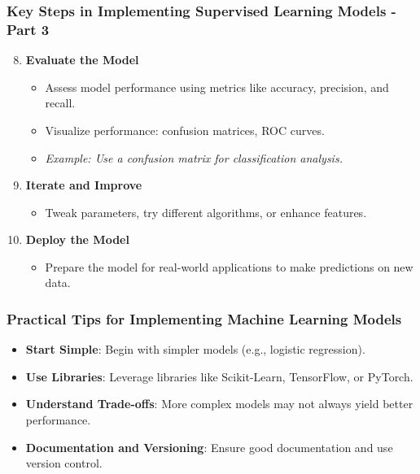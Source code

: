 \documentclass[aspectratio=169]{beamer}
\begin{document}
\begin{frame}[fragile]
    \frametitle{Key Steps in Implementing Supervised Learning Models - Part 3}
    \begin{enumerate}
        \setcounter{enumi}{7} %
        \item \textbf{Evaluate the Model}
            \begin{itemize}
                \item Assess model performance using metrics like accuracy, precision, and recall.
                \item Visualize performance: confusion matrices, ROC curves.
                \item \textit{Example: Use a confusion matrix for classification analysis.}
            \end{itemize}

        \item \textbf{Iterate and Improve}
            \begin{itemize}
                \item Tweak parameters, try different algorithms, or enhance features.
            \end{itemize}

        \item \textbf{Deploy the Model}
            \begin{itemize}
                \item Prepare the model for real-world applications to make predictions on new data.
            \end{itemize}
    \end{enumerate}
\end{frame}

\begin{frame}[fragile]
    \frametitle{Practical Tips for Implementing Machine Learning Models}
    \begin{itemize}
        \item \textbf{Start Simple}: Begin with simpler models (e.g., logistic regression).
        \item \textbf{Use Libraries}: Leverage libraries like Scikit-Learn, TensorFlow, or PyTorch.
        \item \textbf{Understand Trade-offs}: More complex models may not always yield better performance.
        \item \textbf{Documentation and Versioning}: Ensure good documentation and use version control.
    \end{itemize}
\end{frame}
\end{document}
